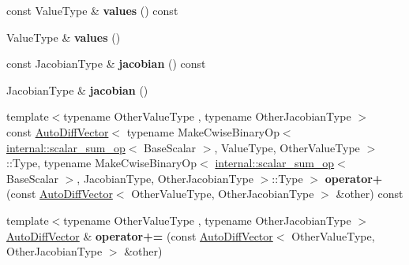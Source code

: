 \begin{DoxyCompactItemize}
const Value\+Type \& {\bfseries values} () const
\item 
\mbox{\label{class_eigen_1_1_auto_diff_vector_aea993221c8ef59c1ce651d51ea5c021b}} 
Value\+Type \& {\bfseries values} ()
\item 
\mbox{\label{class_eigen_1_1_auto_diff_vector_aca679f1915a6bd0e1456532c1f6caba3}} 
const Jacobian\+Type \& {\bfseries jacobian} () const
\item 
\mbox{\label{class_eigen_1_1_auto_diff_vector_a1ea93cae4362f213c53c6ae09ad32f70}} 
Jacobian\+Type \& {\bfseries jacobian} ()
\item 
\mbox{\label{class_eigen_1_1_auto_diff_vector_ad123a9ee90c10e965dbb7d32ffc48565}} 
{\footnotesize template$<$typename Other\+Value\+Type , typename Other\+Jacobian\+Type $>$ }\\const \hyperlink{class_eigen_1_1_auto_diff_vector}{Auto\+Diff\+Vector}$<$ typename Make\+Cwise\+Binary\+Op$<$ \hyperlink{struct_eigen_1_1internal_1_1scalar__sum__op}{internal\+::scalar\+\_\+sum\+\_\+op}$<$ Base\+Scalar $>$, Value\+Type, Other\+Value\+Type $>$\+::Type, typename Make\+Cwise\+Binary\+Op$<$ \hyperlink{struct_eigen_1_1internal_1_1scalar__sum__op}{internal\+::scalar\+\_\+sum\+\_\+op}$<$ Base\+Scalar $>$, Jacobian\+Type, Other\+Jacobian\+Type $>$\+::Type $>$ {\bfseries operator+} (const \hyperlink{class_eigen_1_1_auto_diff_vector}{Auto\+Diff\+Vector}$<$ Other\+Value\+Type, Other\+Jacobian\+Type $>$ \&other) const
\item 
\mbox{\label{class_eigen_1_1_auto_diff_vector_a2459ccb5fe11565e0350c8265ff91c4e}} 
{\footnotesize template$<$typename Other\+Value\+Type , typename Other\+Jacobian\+Type $>$ }\\\hyperlink{class_eigen_1_1_auto_diff_vector}{Auto\+Diff\+Vector} \& {\bfseries operator+=} (const \hyperlink{class_eigen_1_1_auto_diff_vector}{Auto\+Diff\+Vector}$<$ Other\+Value\+Type, Other\+Jacobian\+Type $>$ \&other)
\item 
\mbox{\label{class_eigen_1_1_auto_diff_vector_a90ba44e4e394a5cde3dd6706d42f90df}} 

\end{DoxyCompactItemize}
